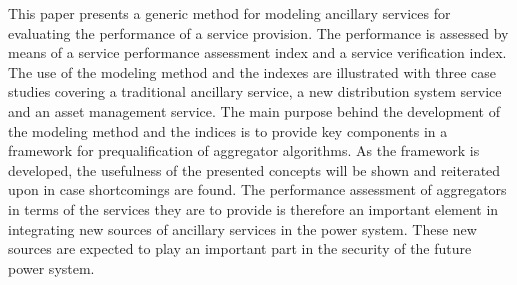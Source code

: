 This paper presents a generic method for modeling ancillary services for evaluating the performance of a service provision. The performance is assessed by means of a service performance assessment index and a service verification index. The use of the modeling method and the indexes are illustrated with three case studies covering a traditional ancillary service, a new distribution system service and an asset management service. The main purpose behind the development of the modeling method and the indices is to provide key components in a framework for prequalification of aggregator algorithms. As the framework is developed, the usefulness of the presented concepts will be shown and reiterated upon in case shortcomings are found. The performance assessment of aggregators in terms of the services they are to provide is therefore an important element in integrating new sources of ancillary services in the power system. These new sources are expected to play an important part in the security of the future power system. %

